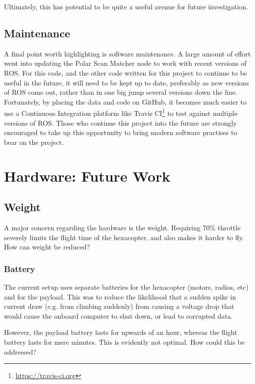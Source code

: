\documentclass[12pt,oneside,a4paper]{book}
\begin{document}
Ultimately, this has potential to be quite a useful avenue for future
investigation.

\subsection{Maintenance}
\label{sec:maintenance}

A final point worth highlighting is software maintenance. A large
amount of effort went into updating the Polar Scan Matcher node to
work with recent versions of ROS. For this code, and the other code
written for this project to continue to be useful in the future, it
will need to be kept up to date, preferably as new versions of ROS
come out, rather than in one big jump several versions down the
line. Fortunately, by placing the data and code on GitHub, it becomes
much easier to use a Continuous Integration platform like
Travis CI\footnote{\url{https://travis-ci.org}} to test against
multiple versions of ROS. Those who continue this project into the
future are strongly encouraged to take up this opportunity to bring
modern software practises to bear on the project.
\newpage
\section{Hardware: Future Work}
\label{sec:discussion-hardware}
\subsection{Weight}
\label{sec:weight}

A major concern regarding the hardware is the weight. Requiring 70\%
throttle severely limits the flight time of the hexacopter, and also
makes it harder to fly. How can weight be reduced?

\subsubsection{Battery}
\label{sec:battery}

The current setup uses separate batteries for the hexacopter (motors,
radios, etc) and for the payload. This was to reduce the likelihood
that a sudden spike in current draw (e.g. from climbing suddenly) from
causing a voltage drop that would cause the onboard computer to shut
down, or lead to corrupted data.

However, the payload battery lasts for upwards of an hour, whereas the
flight battery lasts for mere minutes. This is evidently not
optimal. How could this be addressed?
\end{document}
